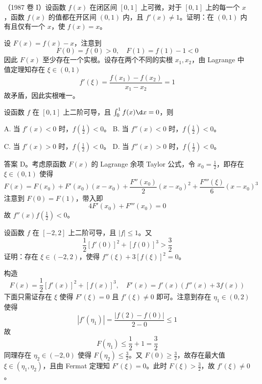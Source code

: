 \begin{problem}[000021]
（1987 卷 I）设函数 $f(x)$ 在闭区间 $[0,1]$ 上可微，对于 $[0, 1]$ 上的每一个 $x$，函数 $f(x)$ 的值都在开区间 $(0, 1)$ 内，且 $f'(x) \neq 1$。证明：在 $(0, 1)$ 内有且仅有一个 $x$，使 $f(x) = x$。
\end{problem}

\begin{solution}
	设 $F(x) = f(x) - x$，注意到
	\[ F(0) = f(0) > 0, \quad F(1) = f(1) - 1 < 0 \]
	因此 $F(x)$ 至少存在一个实根。设存在两个不同的实根 $x_1, x_2$，由 Lagrange 中值定理知存在 $\xi \in (0, 1)$
	\[ f'(\xi) = \frac{f(x_1) - f(x_2)}{x_1 - x_2} = 1 \]
	故矛盾，因此实根唯一。
\end{solution}


\begin{problem}[000023]
设函数 $f$ 在 $[0, 1]$ 上二阶可导，且 $\int_{0}^{1} f(x) \d x = 0$，则

A. 当 $f'(x) < 0$ 时，$f(\frac{1}{2}) < 0$。
B. 当 $f''(x) < 0$ 时，$f(\frac{1}{2}) < 0$。

C. 当 $f'(x) > 0$ 时，$f(\frac{1}{2}) < 0$。
D. 当 $f''(x) > 0$ 时，$f(\frac{1}{2}) < 0$。
\end{problem}

\begin{solution}
	答案 D。考虑原函数 $F(x)$ 的 Lagrange 余项 Taylor 公式，令 $x_0 = \frac{1}{2}$，即存在 $\xi \in (0, 1)$ 使得
	\[ F(x) = F(x_0) + F'(x_0)(x-x_0) + \frac{F''(x_0)}{2}(x-x_0)^2 + \frac{F'''(\xi)}{6}(x-x_0)^3 \]
	注意到 $F(0) = F(1)$，带入即
	\[ 4 F'(x_0) + F'''(x_0) = 0 \]
	故 $f''(x) f(\frac{1}{2}) < 0$。
\end{solution}


\begin{problem}[000024]
设函数 $f$ 在 $[-2, 2]$ 上二阶可导，且 $|f| \leqslant 1$。又
\[ \frac{1}{2}[f'(0)]^2 + [f(0)]^3 > \frac{3}{2} \]
证明：存在 $\xi \in (-2,2)$，使得 $f''(\xi) + 3[f(\xi)]^2 = 0$。
\end{problem}

\begin{solution}
	构造
	\[ F(x) = \frac{1}{2}[f'(x)]^2 + [f(x)]^3,\quad F'(x) = f'(x)(f''(x) + 3f(x)) \]
	下面只需证存在 $\xi$ 使得 $F'(\xi) = 0$ 且 $f'(\xi) \neq 0$ 即可。注意到存在 $\eta_1 \in (0, 2)$ 使得
	\[ |f'(\eta_1)| = \frac{|f(2) - f(0)|}{2 - 0} \leqslant 1 \]
	故
	\[ F(\eta_1) \leqslant \frac{1}{2} + 1 = \frac{3}{2} \]
	同理存在 $\eta_2 \in (-2, 0)$ 使得 $F(\eta_2) \leqslant \frac{3}{2}$。又 $F(0) \geqslant \frac{3}{2}$，故存在最大值 $\xi \in (\eta_1, \eta_2)$，且由 Fermat 定理知 $F'(\xi) = 0$。此时 $F(\xi) > \frac{3}{2}$，故 $f'(\xi) \neq 0$。
\end{solution}


